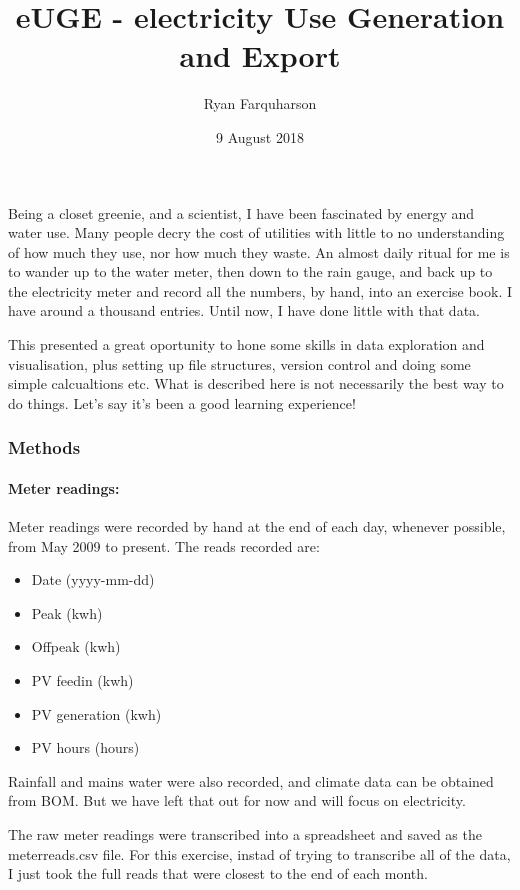 \documentclass[]{article}
\title{eUGE - \textbf{e}lectricity \textbf{U}se \textbf{G}eneration and
\textbf{E}xport}
\author{Ryan Farquharson}
\date{9 August 2018}
\providecommand{\tightlist}{%
  \setlength{\itemsep}{0pt}\setlength{\parskip}{0pt}}
\let\oldparagraph\paragraph
\renewcommand{\paragraph}[1]{\oldparagraph{#1}\mbox{}}
\begin{document}
\maketitle

Being a closet greenie, and a scientist, I have been fascinated by
energy and water use. Many people decry the cost of utilities with
little to no understanding of how much they use, nor how much they
waste. An almost daily ritual for me is to wander up to the water meter,
then down to the rain gauge, and back up to the electricity meter and
record all the numbers, by hand, into an exercise book. I have around a
thousand entries. Until now, I have done little with that data.

This presented a great oportunity to hone some skills in data
exploration and visualisation, plus setting up file structures, version
control and doing some simple calcualtions etc. What is described here
is not necessarily the best way to do things. Let's say it's been a good
learning experience!

\subsubsection{Methods}\label{methods}

\paragraph{Meter readings:}\label{meter-readings}

Meter readings were recorded by hand at the end of each day, whenever
possible, from May 2009 to present. The reads recorded are:

\begin{itemize}
\tightlist
\item
  Date (yyyy-mm-dd)
\item
  Peak (kwh)
\item
  Offpeak (kwh)
\item
  PV feedin (kwh)
\item
  PV generation (kwh)
\item
  PV hours (hours)
\end{itemize}

Rainfall and mains water were also recorded, and climate data can be
obtained from BOM. But we have left that out for now and will focus on
electricity.

The raw meter readings were transcribed into a spreadsheet and saved as
the meterreads.csv file. For this exercise, instad of trying to
transcribe all of the data, I just took the full reads that were closest
to the end of each month.
\end{document}
